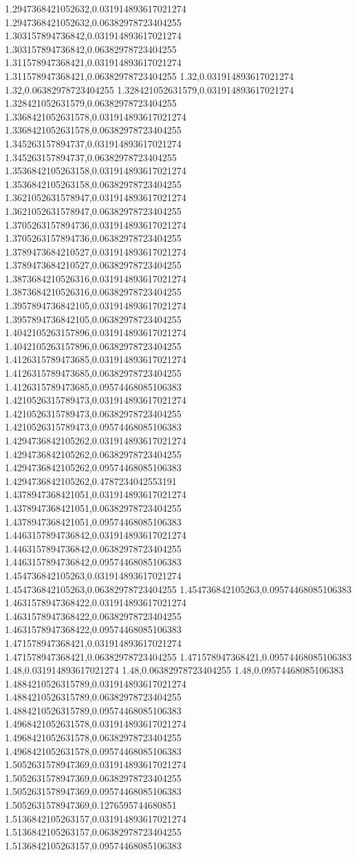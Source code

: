 1.2947368421052632,0.031914893617021274
1.2947368421052632,0.06382978723404255
1.303157894736842,0.031914893617021274
1.303157894736842,0.06382978723404255
1.311578947368421,0.031914893617021274
1.311578947368421,0.06382978723404255
1.32,0.031914893617021274
1.32,0.06382978723404255
1.328421052631579,0.031914893617021274
1.328421052631579,0.06382978723404255
1.3368421052631578,0.031914893617021274
1.3368421052631578,0.06382978723404255
1.345263157894737,0.031914893617021274
1.345263157894737,0.06382978723404255
1.3536842105263158,0.031914893617021274
1.3536842105263158,0.06382978723404255
1.3621052631578947,0.031914893617021274
1.3621052631578947,0.06382978723404255
1.3705263157894736,0.031914893617021274
1.3705263157894736,0.06382978723404255
1.3789473684210527,0.031914893617021274
1.3789473684210527,0.06382978723404255
1.3873684210526316,0.031914893617021274
1.3873684210526316,0.06382978723404255
1.3957894736842105,0.031914893617021274
1.3957894736842105,0.06382978723404255
1.4042105263157896,0.031914893617021274
1.4042105263157896,0.06382978723404255
1.4126315789473685,0.031914893617021274
1.4126315789473685,0.06382978723404255
1.4126315789473685,0.09574468085106383
1.4210526315789473,0.031914893617021274
1.4210526315789473,0.06382978723404255
1.4210526315789473,0.09574468085106383
1.4294736842105262,0.031914893617021274
1.4294736842105262,0.06382978723404255
1.4294736842105262,0.09574468085106383
1.4294736842105262,0.4787234042553191
1.4378947368421051,0.031914893617021274
1.4378947368421051,0.06382978723404255
1.4378947368421051,0.09574468085106383
1.4463157894736842,0.031914893617021274
1.4463157894736842,0.06382978723404255
1.4463157894736842,0.09574468085106383
1.454736842105263,0.031914893617021274
1.454736842105263,0.06382978723404255
1.454736842105263,0.09574468085106383
1.4631578947368422,0.031914893617021274
1.4631578947368422,0.06382978723404255
1.4631578947368422,0.09574468085106383
1.471578947368421,0.031914893617021274
1.471578947368421,0.06382978723404255
1.471578947368421,0.09574468085106383
1.48,0.031914893617021274
1.48,0.06382978723404255
1.48,0.09574468085106383
1.4884210526315789,0.031914893617021274
1.4884210526315789,0.06382978723404255
1.4884210526315789,0.09574468085106383
1.4968421052631578,0.031914893617021274
1.4968421052631578,0.06382978723404255
1.4968421052631578,0.09574468085106383
1.5052631578947369,0.031914893617021274
1.5052631578947369,0.06382978723404255
1.5052631578947369,0.09574468085106383
1.5052631578947369,0.1276595744680851
1.5136842105263157,0.031914893617021274
1.5136842105263157,0.06382978723404255
1.5136842105263157,0.09574468085106383

